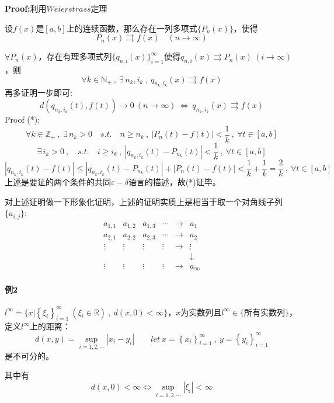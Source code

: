 \textbf{Proof:}利用$Weierstrass$定理
\begin{theorem}[$Weierstrass$定理]
    设$f(x)$是$[a,b]$上的连续函数，那么存在一列多项式$\{P_n(x)\}$，使得
    \[P_n(x) \rightrightarrows f(x) \quad (n \rightarrow \infty)\]
\end{theorem}
$\forall P_n(x)$，存在有理多项式列$\{q_{n,i}(x)\}_{i=1}^{\infty}$使得$q_{n,i}(x) \rightrightarrows P_n(x) \ (i \rightarrow \infty)$，则
\[\forall k \in \mathbb{N}_+ \ , \ \exists \, n_k,i_k \ , \ q_{n_k,i_k}(x) \rightrightarrows f(x)\]
再多证明一步即可:
\[d(q_{n_k,i_k}(t),f(t)) \rightarrow 0 \ (n \rightarrow \infty) \ \Leftrightarrow \ q_{n_k,i_k}(x) \rightrightarrows f(x) \tag{*}\]
Proof (*):
\[\forall k \in \mathbb{Z}_+ \ , \ \exists \, n_k>0 \quad s.t. \quad n \geq n_k \ , \ |P_n(t)-f(t)|<\frac{1}{k} \ , \ \forall t \in [a,b]\]
\[\exists \, i_k>0 \ , \quad s.t. \quad i \geq i_k \ , \ |q_{n_k,i_k}(t)-P_{n_k}(t)|<\frac{1}{k} \ , \ \forall t \in [a,b]\]
\[|q_{n_k,i_k}(t)-f(t)| \leq |q_{n_k,i_k}(t)-P_{n_k}(t)|+|P_n(t)-f(t)|<\frac{1}{k}+\frac{1}{k}=\frac{2}{k} \ , \ \forall t \in [a,b]\]
上述是要证的两个条件的共同$\varepsilon-\delta$语言的描述，故(*)证毕。

对上述证明做一下形象化证明，上述的证明实质上是相当于取一个对角线子列$\{a_{i,j}\}$:
\[
\begin{array}{cccccc}
    a_{1,1} & a_{1,2} & a_{1,3} & \cdots & \rightarrow & a_1 \\
    a_{2,1} & a_{2,2} & a_{2,3} & \cdots & \rightarrow & a_2 \\
    \vdots & \vdots & \vdots & \vdots & \rightarrow & \vdots \\
      &   &   &   &   & \downarrow \\
    \vdots & \vdots & \vdots & \vdots & \rightarrow & a_{\infty}
\end{array}    
\]

\paragraph*{例2} \quad $l^{\infty}=\{x|\left\{\xi_i\right\}_{i=1}^{\infty} \ (\xi_i \in \mathbb{R}) \ , \ d(x,0)<\infty\}$，$x$为实数列且$l^{\infty} \in \{\text{所有实数列}\}$，定义$l^{\infty}$上的距离：
\[d(x,y)=\mathop {\text{sup}}\limits_{i=1,2,\cdots}|x_i-y_i| \qquad let \ x=\left\{x_i\right\}_{i=1}^{\infty} \ , \ y=\left\{y_i\right\}_{i=1}^{\infty}\]
是不可分的。

其中有
\[d(x,0)<\infty \Leftrightarrow \mathop {\text{sup}}\limits_{i=1,2,\cdots}|\xi_i|<\infty\]

